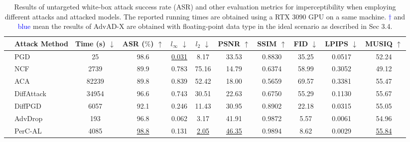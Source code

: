 \documentclass{article}
\begin{document}
\begin{table}[t]
    \caption{Results of untargeted white-box attack success rate (ASR) and other evaluation metrics for imperceptibility when employing different attacks and attacked models. The reported running times are obtained using a RTX 3090 GPU on a same machine. \textcolor{blue}{$\boldsymbol{\dag}$} and \textcolor{blue}{blue} mean the results of AdvAD-X are obtained with floating-point data type in the ideal scenario as described in Sec 3.4.}
    \label{tab:tab01}
    \centering
    {
    \setlength{\tabcolsep}{3.8pt}
    \scriptsize\begin{tabular}{clccccccccc}
        \toprule
         & Attack Method    & Time (s) $\downarrow$  & ASR ($\%$) $\uparrow$ & $l_\infty$ $\downarrow$   & $l_2$ $\downarrow$     & \;PSNR $\uparrow$  & \;SSIM $\uparrow$   & \;FID $\downarrow$   & \;LPIPS $\downarrow$  & \;MUSIQ $\uparrow$   \\
        \midrule
                                    & PGD \cite{madry2018towards}           & 25        & 98.6      & \underline{0.031}     & 8.17      & 33.53     & 0.8830    & 35.25     & 0.0517    & 52.24 \\
                                    & NCF \cite{yuan2022natural}           & 2739      & 89.9      & 0.783     & 75.16     & 14.79     & 0.6374    & 58.99     & 0.3052    & 49.12 \\
                                    & ACA \cite{chen2024content}           & 82239     & 89.8      & 0.839     & 52.42     & 18.00     & 0.5659    & 69.57     & 0.3381    & 55.47 \\
                                    & DiffAttack \cite{chen2023diffusion}    & 34954     & 96.6      & 0.743     & 30.51     & 22.63     & 0.6750    & 55.29     & 0.1130    & 55.67 \\
                                    & DiffPGD \cite{xue2023diffusion}       & 6057      & 92.1      & 0.246     & 11.43     & 30.95     & 0.8902    & 22.18     & 0.0315    & 55.05 \\
                                    & AdvDrop \cite{duan2021advdrop}       & 193       & 96.8      & 0.062     & 3.17      & 41.91     & 0.9872    & 5.57      & 0.0061    & 54.96 \\
                                    & PerC-AL \cite{zhao2020towards}       & 4085      & \underline{98.8}      & 0.131     & \underline{2.05}      & \underline{46.35}     & 0.9894    & 8.62      & 0.0029    & \underline{55.84} \\

\end{tabular}}
\end{table}
\end{document}
